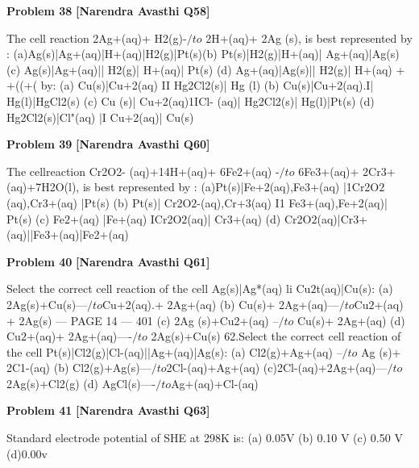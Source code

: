 \begin{problembox}
\textbf{Problem 38} \hfill \textbf{[Narendra Avasthi Q58]}
\label{q:ext-narendra_avasthi_all_questions-38}

The cell reaction 2Ag+(aq)+ H2(g)-$/to$ 2H+(aq)+ 2Ag (s), is best represented by :
(a)Ag(s)|Ag+(aq)|H+(aq)|H2(g)|Pt(s)(b) Pt(s)|H2(g)|H+(aq)| Ag+(aq)|Ag(s)
(c) Ag(s)|Ag+(aq)|| H2(g)| H+(aq)| Pt(s) (d) Ag+(aq)|Ag(s)|| H2(g)| H+(aq)
 + +((+( 
by: 
(a) Cu(s)|Cu+2(aq) II Hg2Cl2(s)| Hg (l)
(b) Cu(s)|Cu+2(aq).I| Hg(l)|HgCl2(s)
(c) Cu (s)| Cu+2(aq)1ICl- (aq)| Hg2Cl2(s)| Hg(l)|Pt(s)
(d) Hg2Cl2(s)|Cl"(aq) |I Cu+2(aq)| Cu(s)
\end{problembox}

\begin{problembox}
\textbf{Problem 39} \hfill \textbf{[Narendra Avasthi Q60]}
\label{q:ext-narendra_avasthi_all_questions-39}

The cellreaction Cr2O2- (aq)+14H+(aq)+ 6Fe$2$+(aq) -$/to$ 6Fe3+(aq)+ 2Cr3+(aq)+7H2O(l),
is best represented by :
(a)Pt(s)|Fe+2(aq),Fe3+(aq) |1Cr2O$2$(aq),Cr3+(aq) |Pt(s)
(b) Pt(s)| Cr2O$2$-(aq),Cr+3(aq) I1 Fe3+(aq),Fe+2(aq)| Pt(s)
(c) Fe$2$+(aq) |Fe+(aq) ICr2O$2$(aq)| Cr3+(aq)
(d) Cr2O$2$(aq)|Cr3+(aq)||Fe3+(aq)|Fe2+(aq)
\end{problembox}

\begin{problembox}
\textbf{Problem 40} \hfill \textbf{[Narendra Avasthi Q61]}
\label{q:ext-narendra_avasthi_all_questions-40}

Select the correct cell reaction of the cell Ag(s)|Ag*(aq) li Cu$2$t(aq)|Cu(s):
(a) 2Ag(s)+Cu(s)---$/to$Cu+2(aq).+ 2Ag+(aq)
(b) Cu(s)+ 2Ag+(aq)---$/to$Cu$2$+(aq) + 2Ag(s)
--- PAGE 14 ---
401
(c) 2Ag (s)+Cu2+(aq) --$/to$ Cu(s)+ 2Ag+(aq)
(d) Cu$2$+(aq)+ 2Ag+(aq)----$/to$ 2Ag(s)+Cu(s)
62.Select the correct cell reaction of the cell Pt(s)|Cl2(g)|Cl-(aq)||Ag+(aq)|Ag(s):
(a) Cl2(g)+Ag+(aq) --$/to$ Ag (s)+ 2C1-(aq)
(b) Cl2(g)+Ag(s)---$/to$2Cl-(aq)+Ag+(aq)
(c)2Cl-(aq)+2Ag+(aq)---$/to$2Ag(s)+Cl2(g)
(d) AgCl(s)----$/to$Ag+(aq)+Cl-(aq)
\end{problembox}

\begin{problembox}
\textbf{Problem 41} \hfill \textbf{[Narendra Avasthi Q63]}
\label{q:ext-narendra_avasthi_all_questions-41}

Standard electrode potential of SHE at 298K is:
(a) 0.05V
(b) 0.10 V
(c) 0.50 V
(d)0.00v
\end{problembox}

